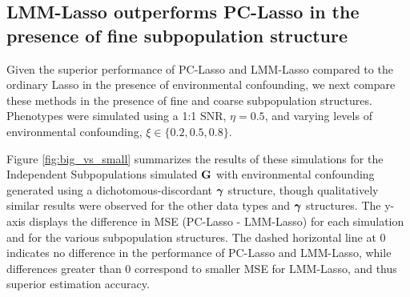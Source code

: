 \subsection{LMM-Lasso outperforms PC-Lasso in the presence of fine subpopulation structure}

Given the superior performance of PC-Lasso and LMM-Lasso compared to the ordinary Lasso in the presence of environmental confounding, we next compare these methods in the presence of fine and coarse subpopulation structures. Phenotypes were simulated using a 1:1 SNR, $\eta = 0.5$, and varying levels of environmental confounding, $\xi \in \{0.2, 0.5,0.8\}$. 

Figure \ref{fig:big_vs_small} summarizes the results of these simulations for the Independent Subpopulations simulated $\textbf{G}$ with environmental confounding generated using a dichotomous-discordant $\boldsymbol{\gamma}$ structure, though qualitatively similar results were observed for the other data types and $\boldsymbol{\gamma}$ structures. The y-axis displays the difference in MSE (PC-Lasso - LMM-Lasso) for each simulation and for the various subpopulation structures. The dashed horizontal line at 0 indicates no difference in the performance of PC-Lasso and LMM-Lasso, while differences greater than 0 correspond to smaller MSE for LMM-Lasso, and thus superior estimation accuracy. 

